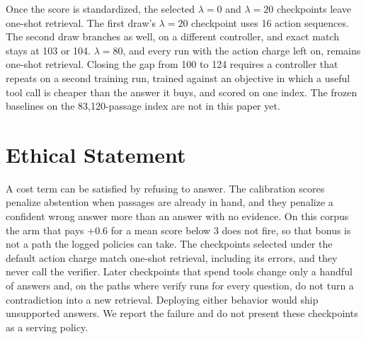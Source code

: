 \documentclass[letterpaper]{article} %
\begin{document}
Once the score is standardized, the selected \(\lambda{=}0\) and \(\lambda{=}20\) checkpoints leave one-shot retrieval. The first draw's \(\lambda{=}20\) checkpoint uses 16 action sequences. The second draw branches as well, on a different controller, and exact match stays at 103 or 104. \(\lambda{=}80\), and every run with the action charge left on, remains one-shot retrieval. Closing the gap from 100 to 124 requires a controller that repeats on a second training run, trained against an objective in which a useful tool call is cheaper than the answer it buys, and scored on one index. The frozen baselines on the 83{,}120-passage index are not in this paper yet.

\section*{Ethical Statement}
A cost term can be satisfied by refusing to answer. The calibration scores penalize abstention when passages are already in hand, and they penalize a confident wrong answer more than an answer with no evidence. On this corpus the arm that pays \(+0.6\) for a mean score below 3 does not fire, so that bonus is not a path the logged policies can take. The checkpoints selected under the default action charge match one-shot retrieval, including its errors, and they never call the verifier. Later checkpoints that spend tools change only a handful of answers and, on the paths where verify runs for every question, do not turn a contradiction into a new retrieval. Deploying either behavior would ship unsupported answers. We report the failure and do not present these checkpoints as a serving policy.


\end{document}

